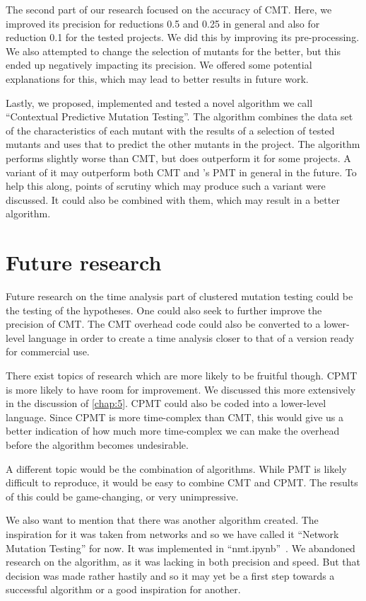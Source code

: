 \documentclass[twoside]{uva-inf-bachelor-thesis}
\begin{document}
The second part of our research focused on the accuracy of CMT. Here, we improved its precision for reductions 0.5 and 0.25 in general and also for reduction 0.1 for the tested projects. We did this by improving its pre-processing. We also attempted to change the selection of mutants for the better, but this ended up negatively impacting its precision. We offered some potential explanations for this, which may lead to better results in future work.

Lastly, we proposed, implemented and tested a novel algorithm we call ``Contextual Predictive Mutation Testing''. The algorithm combines the data set of the characteristics of each mutant with the results of a selection of tested mutants and uses that to predict the other mutants in the project. The algorithm performs slightly worse than CMT, but does outperform it for some projects. A variant of it may outperform both CMT and \textcite{Zhang16}'s PMT in general in the future. To help this along, points of scrutiny which may produce such a variant were discussed. It could also be combined with them, which may result in a better algorithm. 

\section{Future research}
Future research on the time analysis part of clustered mutation testing could be the testing of the hypotheses. One could also seek to further improve the precision of CMT. The CMT overhead code could also be converted to a lower-level language in order to create a time analysis closer to that of a version ready for commercial use.

There exist topics of research which are more likely to be fruitful though. CPMT is more likely to have room for improvement. We discussed this more extensively in the discussion of \cref{chap:5}. CPMT could also be coded into a lower-level language. Since CPMT is more time-complex than CMT, this would give us a better indication of how much more time-complex we can make the overhead before the algorithm becomes undesirable.

A different topic would be the combination of algorithms. While PMT is likely difficult to reproduce, it would be easy to combine CMT and CPMT. The results of this could be game-changing, or very unimpressive.

We also want to mention that there was another algorithm created. The inspiration for it was taken from networks and so we have called it ``Network Mutation Testing'' for now. It was implemented in ``nmt.ipynb''~\cite{aAbdalla-repo}. We abandoned research on the algorithm, as it was lacking in both precision and speed. But that decision was made rather hastily and so it may yet be a first step towards a successful algorithm or a good inspiration for another.
\end{document}

